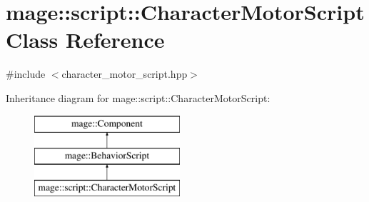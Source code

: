 \hypertarget{classmage_1_1script_1_1_character_motor_script}{}\section{mage\+:\+:script\+:\+:Character\+Motor\+Script Class Reference}
\label{classmage_1_1script_1_1_character_motor_script}


{\ttfamily \#include $<$character\+\_\+motor\+\_\+script.\+hpp$>$}

Inheritance diagram for mage\+:\+:script\+:\+:Character\+Motor\+Script\+:\begin{figure}[H]
\begin{center}
\leavevmode
\includegraphics[height=3.000000cm]{classmage_1_1script_1_1_character_motor_script}
\end{center}
\end{figure}
